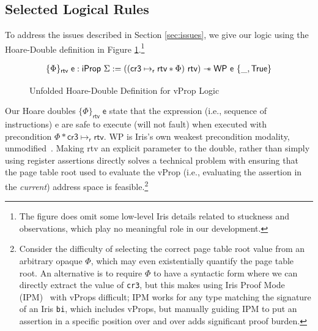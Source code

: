 \documentclass[acmsmall,screen,nonacm]{acmart}
\begin{document}
\subsection{Selected Logical Rules}
\label{sec:selected_rules}
To address the issues described in Section \ref{sec:issues}, we give our logic using
the Hoare-Double definition in Figure \ref{fig:wpddefinition}.\footnote{The figure does
omit some low-level Iris details related to stuckness and observations, which play no meaningful
role in our development.}
\begin{figure} 
  \[
  \begin{array}{l}
    \{ \Phi \}_\mathsf{ rtv }\;\textsf{e} : \textsf{iProp }\Sigma := 
   ((\textsf{cr3} \mapsto_{\textsf{r}} \textsf{rtv} \ast \Phi) \textsf{ rtv}) \mathrel{-\!\!\ast} \textsf{WP e } \{\_, \textsf{True} \}
    \end{array}
  \]
\caption{Unfolded Hoare-Double Definition for \textsf{vProp} Logic }
\label{fig:wpddefinition}
\end{figure}
Our Hoare doubles $\{\Phi\}_\textsf{rtv}\;\textsf{e}$ state that the expression (i.e., sequence of instructions)
\textsf{e} are safe to execute (will not fault)
when executed with precondition $\Phi\ast\textsf{cr3}\mapsto_{\textsf{r}} \textsf{rtv}$.
\textsf{WP} is Iris's own weakest precondition modality, unmodified~\cite{jung2018iris}.
Making \textsf{rtv} an explicit parameter to the double, rather than simply using register assertions
directly solves a technical problem with ensuring that the page table root used to evaluate
the \textsf{vProp} (i.e., evaluating the assertion in the \emph{current}) address space
is feasible.\footnote{Consider the difficulty of selecting the correct page table root value from an arbitrary
opaque $\Phi$, which may even existentially quantify the page table root. An alternative is to
require $\Phi$ to have a syntactic form where we can directly extract the value of \lstinline|cr3|,
but this makes using Iris Proof Mode (IPM)~\cite{Krebbers:2017:IPH:3009837.3009855} with \textsf{vProps}
  difficult; IPM works for any type matching the signature of an Iris \lstinline|bi|, which includes
  \textsf{vProp}s, but manually guiding IPM to put an assertion in a specific position over and over adds
  significant proof burden.
}
\end{document}
